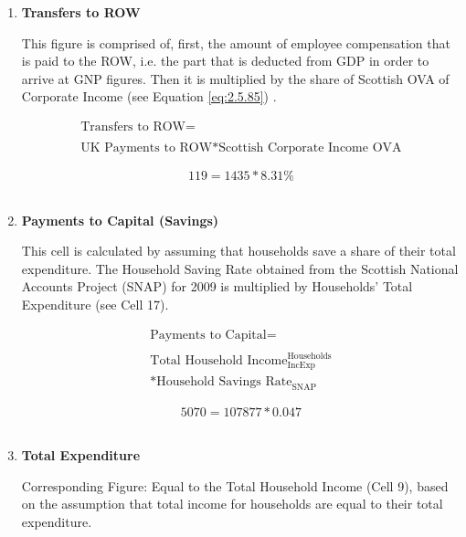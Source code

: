 \begin{enumerate}
\newpage

\item \textbf {Transfers to ROW}

This figure is comprised of, first, the amount of employee compensation that is paid to the ROW, i.e. the part that is deducted from GDP in order to arrive at GNP figures. Then it is multiplied by the share of Scottish OVA of Corporate Income (see Equation \ref{eq:2.5.85}) \cite{ONS2011c}.

\begin{equation}
\begin{split}
\text{Transfers to ROW} =  \\ \\
\text{UK Payments to ROW}*\text{Scottish Corporate Income OVA}
\end{split} \label{eq:2.5.19}
\end{equation}

\begin{equation} \nonumber
119 = 1435*8.31\%
\end{equation}\\


\item \textbf {Payments to Capital (Savings)}

This cell is calculated by assuming that households save a share of their total expenditure. The Household Saving Rate obtained from the Scottish National Accounts Project (SNAP) for 2009 \cite{ScotGov2013c} is multiplied by Households' Total Expenditure (see Cell 17).

\begin{equation}
\begin{split}
\text{Payments to Capital} =  \\ \\
\text{Total Household Income}^\text{Households}_\text{IncExp}\\
*\text{Household Savings Rate}_\text{SNAP}
\end{split} \label{eq:2.5.20}
\end{equation}

\begin{equation} \nonumber
5070 = 107877*0.047
\end{equation}\\


\item \textbf {Total Expenditure}

Corresponding Figure: Equal to the Total Household Income (Cell 9), based on the assumption that total income for households are equal to their total expenditure.


\end{enumerate}
